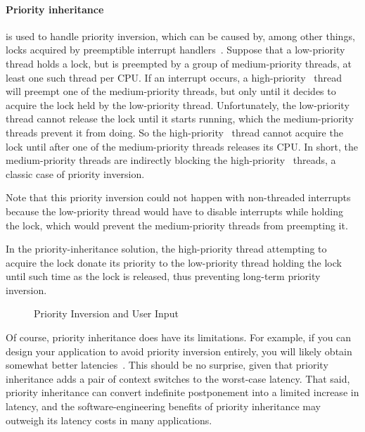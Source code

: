 \paragraph{Priority inheritance} is used to handle priority inversion,
which can be caused by, among other things, locks acquired by
preemptible interrupt handlers~\cite{LuiSha1990PriorityInheritance}.
Suppose that a low-priority thread holds a lock, but is preempted by
a group of medium-priority threads, at least one such thread per CPU.
If an interrupt occurs, a high-priority \IRQ\ thread will preempt one
of the medium-priority threads, but only until it decides to acquire
the lock held by the low-priority thread.
Unfortunately, the low-priority thread cannot release the lock until
it starts running, which the medium-priority threads prevent it from
doing.
So the high-priority \IRQ\ thread cannot acquire the lock until after one
of the medium-priority threads releases its CPU.
In short, the medium-priority threads are indirectly blocking the
high-priority \IRQ\ threads, a classic case of priority inversion.

Note that this priority inversion could not happen with non-threaded
interrupts because the low-priority thread would have to disable interrupts
while holding the lock, which would prevent the medium-priority
threads from preempting it.

In the priority-inheritance solution, the high-priority thread attempting
to acquire the lock donate its priority to the low-priority thread holding
the lock until such time as the lock is released, thus preventing long-term
priority inversion.

\begin{figure}[tb]
\centering
{}
\caption{Priority Inversion and User Input}
\end{figure}

Of course, priority inheritance does have its limitations.
For example, if you can design your application to avoid priority
inversion entirely, you will likely obtain somewhat better
latencies~\cite{VictorYodaiken2004a}.
This should be no surprise, given that priority inheritance adds
a pair of context switches to the worst-case latency.
That said, priority inheritance can convert indefinite postponement
into a limited increase in latency, and the software-engineering
benefits of priority inheritance may outweigh its latency costs in
many applications.

